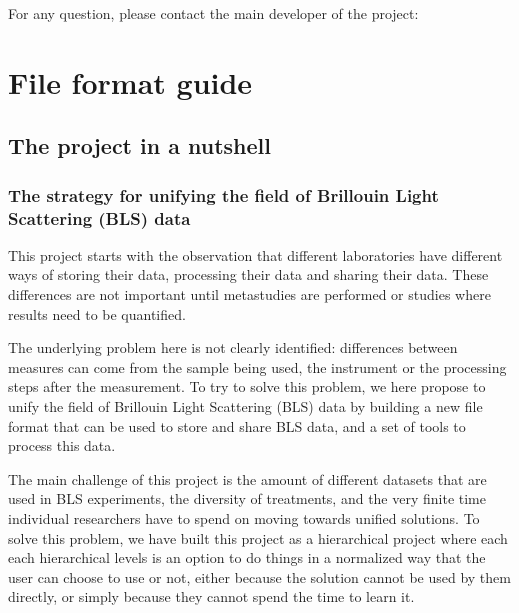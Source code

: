 \documentclass[letterpaper,10pt,english]{sphinxmanual}
\begin{document}
\sphinxAtStartPar
For any question, please contact the main developer of the project: 

\part{File format guide}

\sphinxstepscope


\chapter{The project in a nutshell}
\label{\detokenize{source/project_nutshell:the-project-in-a-nutshell}}\label{\detokenize{source/project_nutshell::doc}}

\section{The strategy for unifying the field of Brillouin Light Scattering (BLS) data}
\label{\detokenize{source/project_nutshell:the-strategy-for-unifying-the-field-of-brillouin-light-scattering-bls-data}}
\sphinxAtStartPar
This project starts with the observation that different laboratories have different ways of storing their data, processing their data and sharing their data. These differences are not important until meta\sphinxhyphen{}studies are performed or studies where results need to be quantified.

\sphinxAtStartPar
The underlying problem here is not clearly identified: differences between measures can come from the sample being used, the instrument or the processing steps after the measurement. To try to solve this problem, we here propose to unify the field of Brillouin Light Scattering (BLS) data by building a new file format that can be used to store and share BLS data, and a set of tools to process this data.

\sphinxAtStartPar
The main challenge of this project is the amount of different datasets that are used in BLS experiments, the diversity of treatments, and the very finite time individual researchers have to spend on moving towards unified solutions. To solve this problem, we have built this project as a hierarchical project where each each hierarchical levels is an option to do things in a normalized way that the user can choose to use or not, either because the solution cannot be used by them directly, or simply because they cannot spend the time to learn it.
\end{document}
